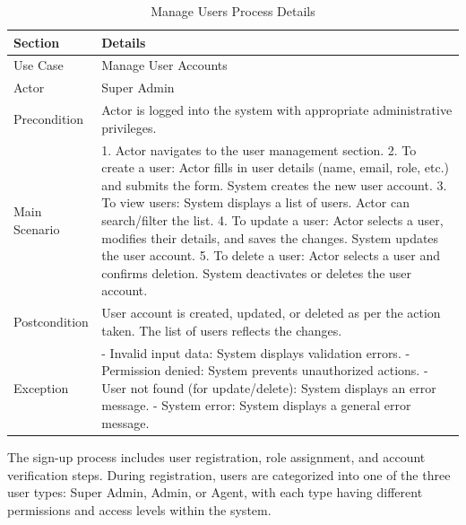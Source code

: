 \begin{table}[htbp]
    \centering
    \begin{tabular}{|l|p{}|}
        \hline
        \textbf{Section} & \textbf{Details} \\
        \hline
        Use Case & Manage User Accounts \\
        \hline
        Actor & Super Admin \\
        \hline
        Precondition & Actor is logged into the system with appropriate administrative privileges. \\
        \hline
        Main Scenario & 
        1. Actor navigates to the user management section.
        2. To create a user: Actor fills in user details (name, email, role, etc.) and submits the form. System creates the new user account.
        3. To view users: System displays a list of users. Actor can search/filter the list.
        4. To update a user: Actor selects a user, modifies their details, and saves the changes. System updates the user account.
        5. To delete a user: Actor selects a user and confirms deletion. System deactivates or deletes the user account. \\
        \hline
        Postcondition & User account is created, updated, or deleted as per the action taken. The list of users reflects the changes. \\
        \hline
        Exception & 
        - Invalid input data: System displays validation errors.
        - Permission denied: System prevents unauthorized actions.
        - User not found (for update/delete): System displays an error message.
        - System error: System displays a general error message. \\
        \hline
    \end{tabular}
    \caption{Manage Users Process Details}
    \label{tab:manage_users_process}
\end{table}


The sign-up process includes user registration, role assignment, and account verification steps. During registration, users are categorized into one of the three user types: Super Admin, Admin, or Agent, with each type having different permissions and access levels within the system.

\newpage

